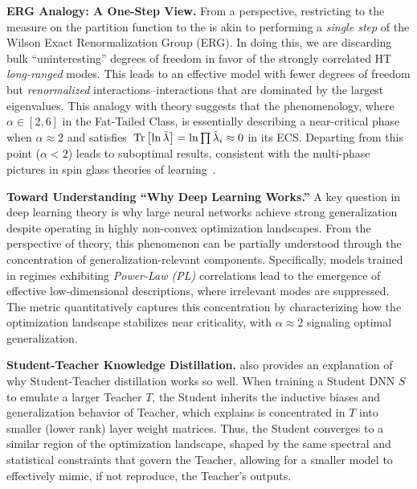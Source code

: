 \vspace{1em}
\noindent
\textbf{ERG Analogy: A One-Step View.}
From a \RenormalizationGroup perspective, restricting to the measure on the partition function to
the \ECS is akin to performing a \emph{single step} of the Wilson Exact Renormalization Group (ERG).
In doing this, we are discarding bulk “uninteresting” degrees of freedom in favor of the strongly correlated 
HT \emph{long-ranged} modes. This leads to an effective model with fewer degrees of freedom but 
\emph{renormalized} interactions--interactions that are dominated by the largest eigenvalues.
This analogy with   \ERG theory suggests that the \HTSR phenomenology, where $\alpha\in[2,6]$ in the Fat-Tailed
\Universality Class, is essentially describing a near-critical phase  when
$\alpha \approx 2$ and satisfies $\mbox{}\operatorname{Tr}\left[\ln \tilde{\lambda}\right]=\ln\prod \tilde{\lambda}_i\approx 0$ in its ECS.
Departing from  this point ($\alpha<2$) leads to suboptimal results, consistent with the multi-phase 
pictures in \STATMECH spin glass theories of learning~\cite{SST92,Gardner_1988,Eng01, EB01_BOOK}.

\vspace{1em}
\noindent
\textbf{Toward Understanding “Why Deep Learning Works.”}
A key question in deep learning theory is why large neural networks achieve strong generalization despite operating in highly non-convex optimization landscapes. From the perspective of \ERG theory, this phenomenon can be partially understood through the concentration of generalization-relevant components. Specifically, models trained in regimes exhibiting \emph{Power-Law (PL)} correlations lead to the emergence of effective low-dimensional descriptions, where irrelevant modes are suppressed. The \WW \ALPHA metric quantitatively captures this concentration by characterizing how the optimization landscape stabilizes near criticality, with $\alpha \approx 2$ signaling optimal generalization.

\vspace{1em}
\noindent
\textbf{Student-Teacher Knowledge Distillation.}
\SETOL also provides an explanation of why Student-Teacher distillation works so well.
When training a Student DNN $S$ to emulate a larger Teacher $T$, the Student inherits the inductive biases and generalization behavior of Teacher, which \SETOL explains is concentrated in $T$ into smaller (lower rank) layer weight matrices.
Thus, the Student converges to a similar region of the optimization landscape, shaped by the same spectral and statistical constraints that govern the Teacher, allowing
for a smaller model to effectively mimic, if not reproduce, the Teacher's outputs.  

